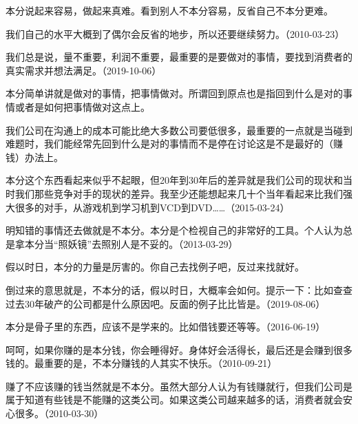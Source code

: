 本分说起来容易，做起来真难。看到别人不本分容易，反省自己不本分更难。

我们自己的水平大概到了偶尔会反省的地步，所以还要继续努力。（2010-03-23）


我们总是说，量不重要，利润不重要，最重要的是要做对的事情，要找到消费者的真实需求并想法满足。（2019-10-06）

本分简单讲就是做对的事情，把事情做对。所谓回到原点也是指回到什么是对的事情或者是如何把事情做对这点上。

我们公司在沟通上的成本可能比绝大多数公司要低很多，最重要的一点就是当碰到难题时，我们能经常先回到什么是对的事情而不是停在讨论这是不是最好的（赚钱）办法上。

本分这个东西看起来似乎不起眼，但20年到30年后的差异就是我们公司的现状和当时我们那些竞争对手的现状的差异。我至少还能想起来几十个当年看起来比我们强大很多的对手，从游戏机到学习机到VCD到DVD……（2015-03-24）

明知错的事情还去做就是不本分。本分是个检视自己的非常好的工具。个人认为总是拿本分当“照妖镜”去照别人是不妥的。（2013-03-29）


假以时日，本分的力量是厉害的。你自己去找例子吧，反过来找就好。


倒过来的意思就是，不本分的话，假以时日，大概率会如何。提示一下：比如查查过去30年破产的公司都是什么原因吧。反面的例子比比皆是。（2019-08-06）


本分是骨子里的东西，应该不是学来的。比如借钱要还等等。（2016-06-19）


呵呵，如果你赚的是本分钱，你会睡得好。身体好会活得长，最后还是会赚到很多钱的。最重要的是，不本分赚钱的人其实不快乐。（2010-09-21）


赚了不应该赚的钱当然就是不本分。虽然大部分人认为有钱赚就行，但我们公司是属于知道有些钱是不能赚的这类公司。如果这类公司越来越多的话，消费者就会安心很多。（2010-03-30）

